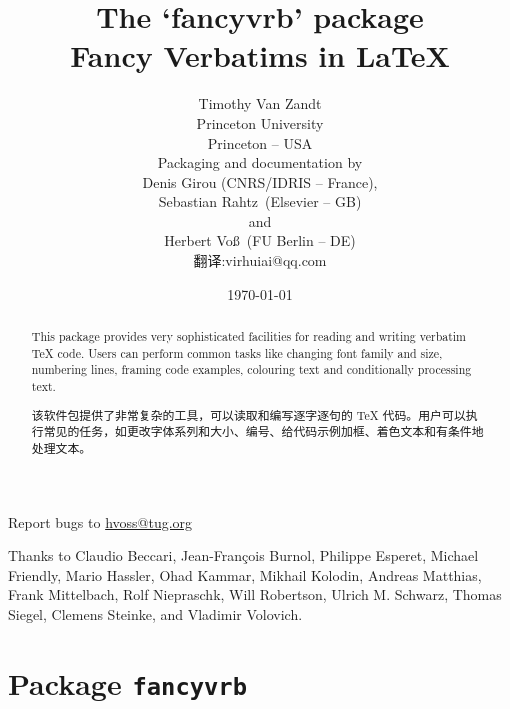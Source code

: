 \documentclass[twoside]{article}
\title{The `\textsf{fancyvrb}' package\\Fancy Verbatims in \LaTeX}
\author{Timothy Van Zandt\\Princeton University\\Princeton -- USA\\[5mm]
        {Packaging and documentation by}\\
        {\footnotesize Denis Girou (CNRS/IDRIS -- France),}\\[-2mm]
        {\footnotesize Sebastian Rahtz\dagger\ (Elsevier -- GB)}\\[-2mm]
        {\footnotesize and}\\[-2mm]
        {\footnotesize Herbert Voß\ (FU Berlin -- DE)}\\[-2mm]
        {\footnotesize 翻译:virhuiai@qq.com}
        }
\date{\today}
\begin{document}
\parindent=0pt
\maketitle

\VerbatimFootnotes
%
\begin{abstract}
\hspace*{-\parindent}%
This package provides very sophisticated facilities for reading and
writing verbatim \TeX{} code. Users can perform common tasks like changing
font family and size, numbering lines, framing code examples, colouring
text and conditionally processing text.

\hspace*{-\parindent}%
该软件包提供了非常复杂的工具，可以读取和编写逐字逐句的 \TeX{} 代码。用户可以执行常见的任务，如更改字体系列和大小、编号、给代码示例加框、着色文本和有条件地处理文本。

    
\end{abstract}

\begin{center}
Report bugs to \url{hvoss@tug.org}
\end{center}

\vfill
Thanks to 
Claudio Beccari,
Jean-François Burnol, 
Philippe Esperet, %
Michael Friendly, %
Mario Hassler, %
Ohad Kammar, %
Mikhail Kolodin, %
Andreas Matthias,
Frank Mittelbach,
Rolf Niepraschk, %
Will Robertson,
Ulrich M. Schwarz, 
Thomas Siegel, %
Clemens Steinke,
and 
Vladimir Volovich. %
\clearpage
\tableofcontents
\clearpage


\part{Package \texttt{fancyvrb}}
\end{document}
